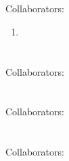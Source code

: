 \documentclass{article}[11pt]
\begin{document}
\section{}
Collaborators: 
\begin{enumerate}[label=(\alph*), wide, labelwidth=!, labelindent=0pt]
\item 
\end{enumerate}

\newpage
\section{}
Collaborators: 



\newpage
\section{}
Collaborators: 



\newpage
\section{}
Collaborators: 
\end{document}

